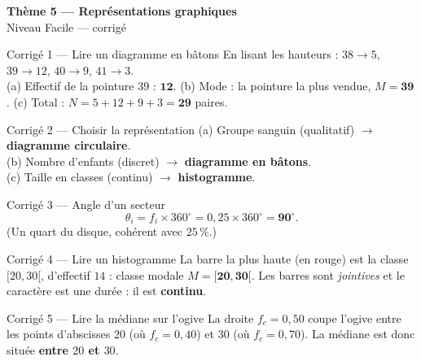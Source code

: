 \documentclass[11pt,a4paper]{article}
\newcommand{\bandeau}[2]{%
\begin{tcolorbox}[boxbase,colback=primary,colframe=primarydark,halign=center,
   before skip=2pt,after skip=12pt]
{\LARGE\bfseries\color{white} #1}\\[3pt]{\normalsize\color{white} #2}
\end{tcolorbox}}
\begin{document}
\bandeau{Thème 5 — Représentations graphiques}{Niveau Facile — corrigé}

\begin{corbox}{Corrigé 1 — Lire un diagramme en bâtons}
En lisant les hauteurs : $38\to5$, $39\to12$, $40\to9$, $41\to3$.\\
(a) Effectif de la pointure $39$ : $\mathbf{12}$. \quad
(b) Mode : la pointure la plus vendue, $M=\mathbf{39}$. \quad
(c) Total : $N=5+12+9+3=\mathbf{29}$ paires.
\end{corbox}

\begin{corbox}{Corrigé 2 — Choisir la représentation}
(a) Groupe sanguin (qualitatif) $\to$ \textbf{diagramme circulaire}.\\
(b) Nombre d'enfants (discret) $\to$ \textbf{diagramme en bâtons}.\\
(c) Taille en classes (continu) $\to$ \textbf{histogramme}.
\end{corbox}

\begin{corbox}{Corrigé 3 — Angle d'un secteur}
\[ \theta_i=f_i\times360^\circ=0{,}25\times360^\circ=\mathbf{90^\circ}. \]
(Un quart du disque, cohérent avec $25\,\%$.)
\end{corbox}

\begin{corbox}{Corrigé 4 — Lire un histogramme}
La barre la plus haute (en rouge) est la classe $[20,30[$, d'effectif $14$ : classe modale
$M=\mathbf{[20,30[}$. Les barres sont \emph{jointives} et le caractère est une durée : il est
\textbf{continu}.
\end{corbox}

\begin{corbox}{Corrigé 5 — Lire la médiane sur l'ogive}
La droite $f_c=0{,}50$ coupe l'ogive entre les points d'abscisses $20$ (où $f_c=0{,}40$) et $30$
(où $f_c=0{,}70$). La médiane est donc située \textbf{entre $20$ et $30$}.
\end{corbox}
\end{document}
